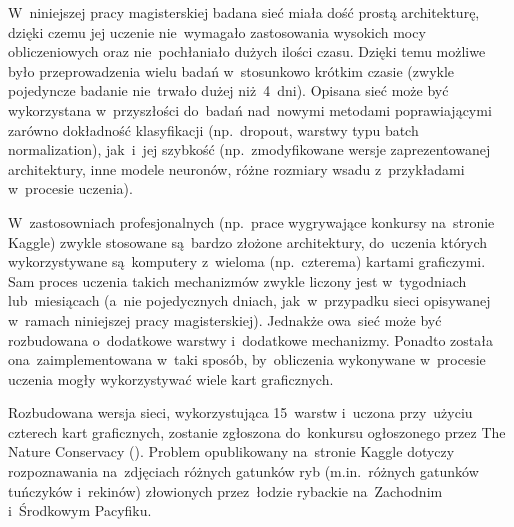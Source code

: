 W~niniejszej pracy magisterskiej badana sieć miała dość prostą architekturę, dzięki czemu jej uczenie nie~wymagało
zastosowania wysokich mocy obliczeniowych oraz nie~pochłaniało dużych ilości czasu. Dzięki temu możliwe było
przeprowadzenia wielu badań w~stosunkowo krótkim czasie (zwykle pojedyncze badanie nie~trwało dużej niż~4~dni).
Opisana sieć może być wykorzystana w~przyszłości do~badań nad~nowymi metodami poprawiającymi zarówno dokładność
klasyfikacji (np.~dropout, warstwy typu batch normalization), jak~i~jej szybkość (np.~zmodyfikowane wersje
zaprezentowanej architektury, inne modele neuronów, różne rozmiary wsadu z~przykładami w~procesie uczenia).

W~zastosowniach profesjonalnych (np.~prace wygrywające konkursy na~stronie Kaggle) zwykle stosowane są~bardzo złożone
architektury, do~uczenia których wykorzystywane są~komputery z~wieloma (np.~czterema) kartami graficzymi. Sam proces
uczenia takich mechanizmów zwykle liczony jest w~tygodniach lub~miesiącach (a~nie pojedycznych dniach, jak~w~przypadku
sieci opisywanej w~ramach niniejszej pracy magisterskiej). Jednakże owa~sieć może być rozbudowana o~dodatkowe warstwy
i~dodatkowe mechanizmy. Ponadto została ona~zaimplementowana w~taki sposób, by~obliczenia wykonywane w~procesie uczenia
mogły wykorzystywać wiele kart graficznych.

Rozbudowana wersja sieci, wykorzystująca 15~warstw i~uczona przy~użyciu czterech kart graficznych, zostanie zgłoszona
do~konkursu ogłoszonego przez The Nature Conservacy (\cite{nature-conservacy}). Problem opublikowany na~stronie Kaggle
dotyczy rozpoznawania na~zdjęciach różnych gatunków ryb (m.in.~różnych gatunków tuńczyków i~rekinów) złowionych
przez~łodzie rybackie na~Zachodnim i~Środkowym Pacyfiku.